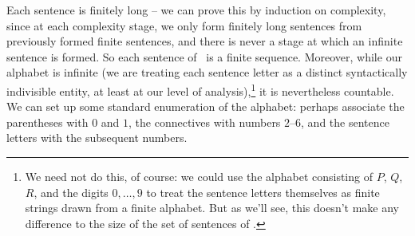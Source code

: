 Each sentence is finitely long – we can prove this by induction on complexity, since at each complexity stage, we only form finitely long sentences from previously formed finite sentences, and there is never a stage at which an infinite sentence is formed. So each sentence of \lone\ is a finite sequence. Moreover, while our alphabet is infinite (we are treating each sentence letter as a distinct syntactically indivisible entity, at least at our level of analysis),\footnote{We need not do this, of course: we could use the alphabet consisting of $P$, $Q$, $R$, and the digits $0,\ldots, 9$ to treat the sentence letters themselves as finite strings drawn from a finite alphabet. But as we'll see, this doesn't make any difference to the size of the set of sentences of \lone.} it is nevertheless countable. We can set up some standard enumeration of the alphabet: perhaps associate the parentheses with $0$ and $1$, the connectives with numbers $2$–$6$, and the sentence letters with the subsequent numbers. 

